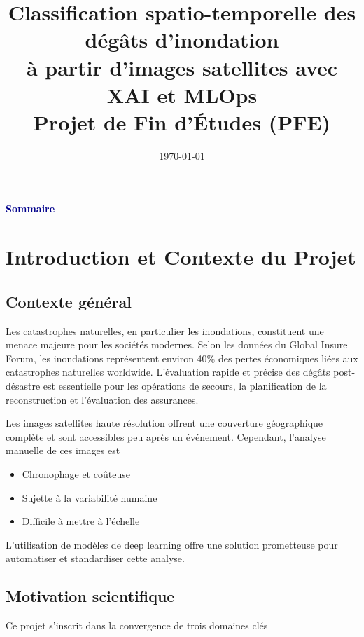 \documentclass[12pt,a4paper]{article}
\title{
    \textbf{\Large Classification spatio-temporelle des dégâts d'inondation} \\
    \textbf{\Large à partir d'images satellites avec XAI et MLOps}
    \\[0.5cm]
    \normalsize Projet de Fin d'Études (PFE)
}
\author{}
\date{\today}
\begin{document}
\maketitle
\thispagestyle{empty}

\vspace{2cm}

\begin{center}
    \textcolor{darkblue}{\textbf{Sommaire}}
\end{center}

\vspace{1cm}

\tableofcontents

\newpage

\section{Introduction et Contexte du Projet}

\subsection{Contexte général}
Les catastrophes naturelles, en particulier les inondations, constituent une menace majeure pour les sociétés modernes. Selon les données du Global Insure Forum, les inondations représentent environ 40\% des pertes économiques liées aux catastrophes naturelles worldwide. L'évaluation rapide et précise des dégâts post-désastre est essentielle pour les opérations de secours, la planification de la reconstruction et l'évaluation des assurances.

Les images satellites haute résolution offrent une couverture géographique complète et sont accessibles peu après un événement. Cependant, l'analyse manuelle de ces images est\:
\begin{itemize}
    \item Chronophage et coûteuse
    \item Sujette à la variabilité humaine
    \item Difficile à mettre à l'échelle
\end{itemize}

L'utilisation de modèles de deep learning offre une solution prometteuse pour automatiser et standardiser cette analyse.

\subsection{Motivation scientifique}
Ce projet s'inscrit dans la convergence de trois domaines clés\:
\end{document}
